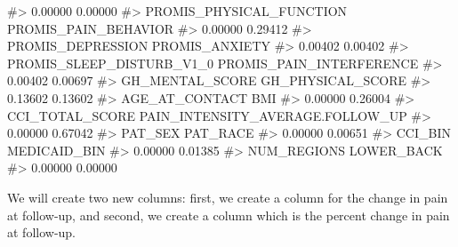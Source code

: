 \documentclass[
  letterpaper,
]{krantz}
\makeatletter
\newenvironment{Shaded}{\begin{snugshade}}{\end{snugshade}}
\newcommand{\CommentTok}[1]{\textcolor[rgb]{0.37,0.37,0.37}{#1}}
\newcommand{\FunctionTok}[1]{\textcolor[rgb]{0.28,0.35,0.67}{#1}}
\newcommand{\NormalTok}[1]{\textcolor[rgb]{0.00,0.23,0.31}{#1}}
\newcommand{\OtherTok}[1]{\textcolor[rgb]{0.00,0.23,0.31}{#1}}
\newcommand{\SpecialCharTok}[1]{\textcolor[rgb]{0.37,0.37,0.37}{#1}}
\newenvironment{kframe}{%
\medskip{}
\setlength{\fboxsep}{.8em}
 \def\at@end@of@kframe{}%
 \ifinner\ifhmode%
  \def\at@end@of@kframe{\end{minipage}}%
  \begin{minipage}{\columnwidth}%
 \fi\fi%
 \def\FrameCommand##1{\hskip\@totalleftmargin \hskip-\fboxsep
 \colorbox{shadecolor}{##1}\hskip-\fboxsep
     \hskip-\linewidth \hskip-\@totalleftmargin \hskip\columnwidth}%
 \MakeFramed {\advance\hsize-\width
   \@totalleftmargin\z@ \linewidth\hsize
   \@setminipage}}%
 {\par\unskip\endMakeFramed%
 \at@end@of@kframe}
\renewenvironment{Shaded}{\begin{kframe}}{\end{kframe}}
\makeatother
\begin{document}
\begin{Shaded}
\begin{Highlighting}[]
\CommentTok{\#\textgreater{}                          0.00000                          0.00000 }
\CommentTok{\#\textgreater{}         PROMIS\_PHYSICAL\_FUNCTION             PROMIS\_PAIN\_BEHAVIOR }
\CommentTok{\#\textgreater{}                          0.00000                          0.29412 }
\CommentTok{\#\textgreater{}                PROMIS\_DEPRESSION                   PROMIS\_ANXIETY }
\CommentTok{\#\textgreater{}                          0.00402                          0.00402 }
\CommentTok{\#\textgreater{}        PROMIS\_SLEEP\_DISTURB\_V1\_0         PROMIS\_PAIN\_INTERFERENCE }
\CommentTok{\#\textgreater{}                          0.00402                          0.00697 }
\CommentTok{\#\textgreater{}                  GH\_MENTAL\_SCORE                GH\_PHYSICAL\_SCORE }
\CommentTok{\#\textgreater{}                          0.13602                          0.13602 }
\CommentTok{\#\textgreater{}                   AGE\_AT\_CONTACT                              BMI }
\CommentTok{\#\textgreater{}                          0.00000                          0.26004 }
\CommentTok{\#\textgreater{}                  CCI\_TOTAL\_SCORE PAIN\_INTENSITY\_AVERAGE.FOLLOW\_UP }
\CommentTok{\#\textgreater{}                          0.00000                          0.67042 }
\CommentTok{\#\textgreater{}                          PAT\_SEX                         PAT\_RACE }
\CommentTok{\#\textgreater{}                          0.00000                          0.00651 }
\CommentTok{\#\textgreater{}                          CCI\_BIN                     MEDICAID\_BIN }
\CommentTok{\#\textgreater{}                          0.00000                          0.01385 }
\CommentTok{\#\textgreater{}                      NUM\_REGIONS                       LOWER\_BACK }
\CommentTok{\#\textgreater{}                          0.00000                          0.00000}
\end{Highlighting}
\end{Shaded}

We will create two new columns: first, we create a column for the change
in pain at follow-up, and second, we create a column which is the
percent change in pain at follow-up.

\begin{Shaded}
\end{Shaded}
\end{document}
